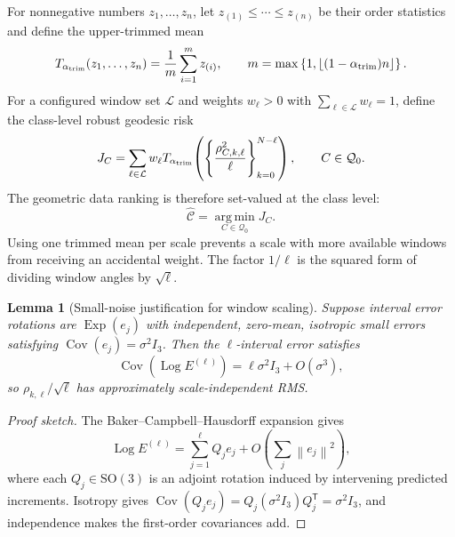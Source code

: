 \documentclass[11pt]{article}
\newtheorem{lemma}[theorem]{Lemma}
\newcommand{\SO}{\mathrm{SO}(3)}
\newcommand{\I}{I_3}
\newcommand{\T}{\mathsf{T}}
\newcommand{\Exp}{\operatorname{Exp}}
\newcommand{\Log}{\operatorname{Log}}
\newcommand{\argmin}{\operatorname*{arg\,min}}
\newcommand{\norm}[1]{\left\lVert #1 \right\rVert}
\newcommand{\set}[1]{\left\{ #1 \right\}}
\begin{document}
    For nonnegative numbers $z_1,\ldots,z_n$, let
    $z_{(1)}\le\cdots\le z_{(n)}$ be their order statistics and define the upper-trimmed
    mean
    \begin{equation}
        T_{\alpha_{\rm trim}}(z_1,\ldots,z_n)
        =\frac{1}{m}\sum_{i=1}^{m}z_{(i)},
        \qquad
        m=\max\set{1,\left\lfloor(1-\alpha_{\rm trim})n\right\rfloor}.
    \end{equation}
    For a configured window set $\mathcal L$ and weights $w_\ell>0$ with
    $\sum_{\ell\in\mathcal L}w_\ell=1$, define the class-level robust geodesic risk
    \begin{equation}
        J_C
        =\sum_{\ell\in\mathcal L}w_\ell
        T_{\alpha_{\rm trim}}\!\left(
                                   \left\{\frac{\rho_{C,k,\ell}^2}{\ell}\right\}_{k=0}^{N-\ell}
        \right),
        \qquad C\in\mathcal Q_0.
        \label{eq:robust-risk}
    \end{equation}
    The geometric data ranking is therefore set-valued at the class level:
    \begin{equation}
        \widehat{\mathcal C}
        =\argmin_{C\in\mathcal Q_0}J_C.
    \end{equation}
    Using one trimmed mean per scale prevents a scale with more available windows from
    receiving an accidental weight. The factor $1/\ell$ is the squared form of dividing
    window angles by $\sqrt{\ell}$.

    \begin{lemma}[Small-noise justification for window scaling]
Suppose interval error rotations are $\Exp(e_j)$ with independent,
zero-mean, isotropic small errors satisfying
$\operatorname{Cov}(e_j)=\sigma^2\I$. Then the $\ell$-interval error satisfies
\begin{equation}
    \operatorname{Cov}\!\left(\Log E^{(\ell)}\right)
    =\ell\sigma^2\I+O(\!\sigma^3),
\end{equation}
so $\rho_{k,\ell}/\sqrt{\ell}$ has approximately scale-independent RMS.
    \end{lemma}

    \begin{proof}[Proof sketch]
The Baker--Campbell--Hausdorff expansion gives
\begin{equation}
    \Log E^{(\ell)}
    =\sum_{j=1}^{\ell}Q_j e_j
    +O\!\left(\sum_j\norm{e_j}^2\right),
\end{equation}
where each $Q_j\in\SO$ is an adjoint rotation induced by intervening predicted
increments. Isotropy gives
$\operatorname{Cov}(Q_je_j)=Q_j(\sigma^2\I)Q_j^{\T}=\sigma^2\I$, and independence
makes the first-order covariances add.
    \end{proof}
\end{document}
